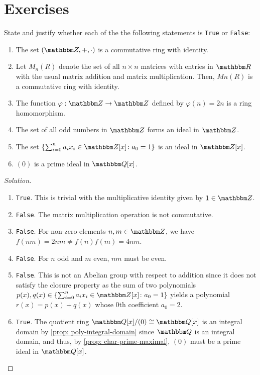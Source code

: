 \newpage
\section{Exercises}
\begin{exercise}
State and justify whether each of the the following statements is {\tt True} or {\tt False}:
\begin{enumerate}
    \item The set $(\Z, +, \cdot)$ is a commutative ring with identity.
    \item Let $M_n(R)$ denote the set of all $n \times n$ matrices with entries in $\R$ with the usual matrix addition and matrix multiplication. Then, $Mn(R)$ is a commutative ring with identity.
    \item The function $\varphi : \Z \to \Z$ defined by $\varphi(n) = 2n$ is a ring homomorphism.
    \item The set of all odd numbers in $\Z$ forms an ideal in $\Z$.
    \item The set $\{\sum_{i=0}^n a_ix_i \in \Z[x] \colon a_0 = 1\}$ is an ideal in $\Z[x]$.
    \item $(0)$ is a prime ideal in $\Q[x]$.
\end{enumerate}
\end{exercise}
\begin{proof}[Solution] \ 
    \begin{enumerate}
    \item {\tt True}. This is trivial with the multiplicative identity given by $1\in \Z$.
    \item {\tt False}. The matrix multiplication operation is not commutative.
    \item {\tt False}. For non-zero elements $n, m \in \Z$, we have $f(nm) = 2nm \neq f(n)f(m) = 4nm$.
    \item {\tt False}. For $n$ odd and $m$ even, $nm$ must be even.
    \item {\tt False}. This is not an Abelian group with respect to addition since  it does not satisfy the closure property as the sum of two polynomials $p(x), q(x) \in \{\sum_{i=0}^n a_ix_i \in \Z[x] \colon a_0 = 1\}$ yields a polynomial $r(x) = p(x)+q(x)$ whose $0$th coefficient $a_0 = 2$.
    \item {\tt True}. The quotient ring $\Q[x]/{(0)} \cong \Q[x]$ is an integral domain by \cref{prop: poly-integral-domain} since $\Q$ is an integral domain, and thus, by \cref{prop: char-prime-maximal}, $(0)$ must be a prime ideal in $\Q[x]$. 
\end{enumerate}
\end{proof}

